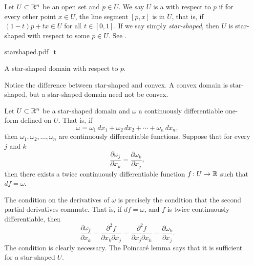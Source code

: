 \begin{defn}
Let $U \subset {\mathbb{R}}^n$ be an open set and $p \in U$.  We say $U$ is
a \emph{}
with respect to $p$ if for every other point $x \in U$,
the line segment $[p,x]$ is in $U$, that is, if
$(1-t)p + tx \in U$ for all $t \in [0,1]$.
If we say simply \emph{star-shaped}, then $U$ is star-shaped with respect to
some $p \in U$.  See .
\begin{myfigureht}
{starshaped.pdf_t}
\caption{A star-shaped domain with respect to $p$.\label{fig:starshaped}}
\end{myfigureht}
\end{defn}

Notice the difference between star-shaped and convex.  A convex domain is
star-shaped, but a star-shaped domain need not be convex.

\begin{thm}
Let $U \subset {\mathbb{R}}^n$ be a star-shaped domain and $\omega$ a continuously
differentiable one-form defined on $U$.  That is, if
\begin{equation*}
\omega =
\omega_1 \,dx_1 +
\omega_2 \,dx_2 + \cdots +
\omega_n \,dx_n ,
\end{equation*}
then $\omega_1,\omega_2,\ldots,\omega_n$ are continuously differentiable
functions.  Suppose that for every $j$ and $k$
\begin{equation*}
\frac{\partial \omega_j}{\partial x_k} = \frac{\partial \omega_k}{\partial x_j} ,
\end{equation*}
then there exists a twice continuously differentiable function $f \colon U
\to {\mathbb{R}}$
such that $df = \omega$.
\end{thm}

The condition on the derivatives of $\omega$ is precisely the condition
that the second partial derivatives commute.  That is, if $df = \omega$,
and $f$ is twice continuously differentiable, then
\begin{equation*}
\frac{\partial \omega_j}{\partial x_k}
=
\frac{\partial^2 f}{\partial x_k \partial x_j} 
=
\frac{\partial^2 f}{\partial x_j \partial x_k} 
=
\frac{\partial \omega_k}{\partial x_j} .
\end{equation*}
The condition is clearly necessary.  The Poincar\'e lemma says that it is
sufficient for a star-shaped $U$.

